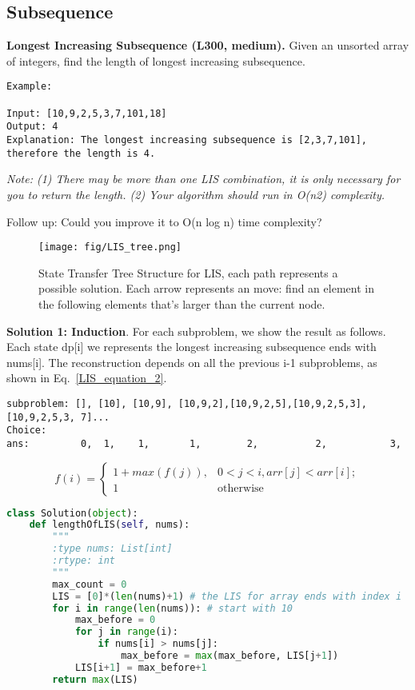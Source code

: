 \documentclass[../main.tex]{subfiles}
\begin{document}
\subsection{Subsequence}
\begin{examples}[resume]
    \item \textbf{Longest Increasing Subsequence (L300, medium).} Given an unsorted array of integers, find the length of longest increasing subsequence.
\begin{lstlisting}[numbers=none]
Example:

Input: [10,9,2,5,3,7,101,18]
Output: 4 
Explanation: The longest increasing subsequence is [2,3,7,101], therefore the length is 4. 
\end{lstlisting}
\textit{Note: (1) There may be more than one LIS combination, it is only necessary for you to return the length. (2) Your algorithm should run in O(n2) complexity.}

Follow up: Could you improve it to O(n log n) time complexity?

\begin{figure}[h]
    \centering
    \texttt{[image: fig/LIS\_tree.png]}
    \caption{State Transfer Tree Structure for LIS, each path represents a possible solution. Each arrow represents an move: find an element in the following elements that's larger than the current node.}
    \label{fig:tree_lis}
\end{figure}
\textbf{Solution 1: Induction}. For each subproblem, we show the result as follows. Each state dp[i] we represents the longest increasing subsequence ends with nums[i]. The reconstruction depends on all the previous i-1 subproblems, as shown in Eq.~\ref{LIS_equation_2}.
\begin{lstlisting}
subproblem: [], [10], [10,9], [10,9,2],[10,9,2,5],[10,9,2,5,3], [10,9,2,5,3, 7]...
Choice: 
ans:         0,  1,    1,       1,        2,          2,           3,         
\end{lstlisting}
\begin{equation}
\label{LIS_equation_2}
    f(i) = \begin{cases}
    1 + max(f(j)),& 0<j<i, arr[j] < arr[i];\\
    1& \text{otherwise}
    \end{cases}
\end{equation}
\begin{lstlisting}[language= Python]
class Solution(object):
    def lengthOfLIS(self, nums):
        """
        :type nums: List[int]
        :rtype: int
        """
        max_count = 0
        LIS = [0]*(len(nums)+1) # the LIS for array ends with index i
        for i in range(len(nums)): # start with 10
            max_before = 0
            for j in range(i): 
                if nums[i] > nums[j]:
                    max_before = max(max_before, LIS[j+1])
            LIS[i+1] = max_before+1
        return max(LIS)
\end{lstlisting}
\end{examples}
\end{document}
